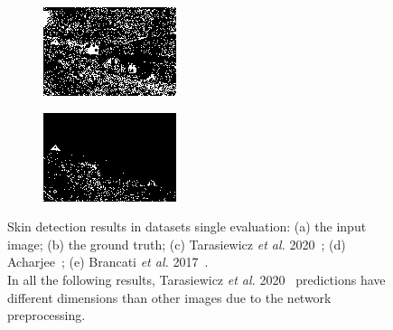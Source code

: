\begin{figure}[h]
\begin{subfigure}[b]{0.18\textwidth}
         \includegraphics[width=\textwidth]{images/results/base/greenland.205.color.d3_bayes.png}
         \caption{}
     \end{subfigure}
     \hfill
     \begin{subfigure}[b]{0.18\textwidth}
         \centering
         \includegraphics[width=\textwidth]{images/results/base/greenland.205.color.d3_dyc.png}
         \caption{}
     \end{subfigure}
        \caption{Skin detection results in datasets single evaluation: (a) the input image; (b) the ground truth; (c) Tarasiewicz \textit{et al.} 2020~\cite{tarasiewicz2020skinny}; (d) Acharjee~\cite{acharjee2018skin}; (e) Brancati \textit{et al.} 2017~\cite{brancati2017human}.\\
        In all the following results, Tarasiewicz \textit{et al.} 2020~\cite{tarasiewicz2020skinny} predictions have different dimensions than other images due to the network preprocessing.}
        \label{fig:base-normal-samples}
\end{figure}


